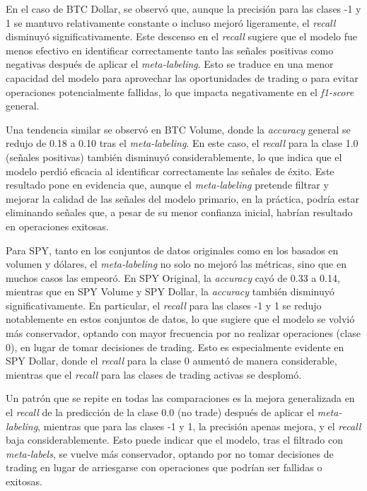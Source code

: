 \documentclass[a4paper,12pt, twoside]{report}
\begin{document}
En el caso de BTC Dollar, se observó que, aunque la precisión para las clases -1 y 1 se mantuvo relativamente 
constante o incluso mejoró ligeramente, el \textit{recall} disminuyó significativamente. Este descenso en el \textit{recall} 
sugiere que el modelo fue menos efectivo en identificar correctamente tanto las señales positivas como negativas después de 
aplicar el \textit{meta-labeling}. Esto se traduce en una menor capacidad del modelo para aprovechar las oportunidades de 
trading o para evitar operaciones potencialmente fallidas, lo que impacta negativamente en el \textit{f1-score} general.

Una tendencia similar se observó en BTC Volume, donde la \textit{accuracy} general se redujo de 0.18 a 0.10 tras el 
\textit{meta-labeling}. En este caso, el \textit{recall} para la clase 1.0 (señales positivas) también disminuyó 
considerablemente, lo que indica que el modelo perdió eficacia al identificar correctamente las señales de éxito. 
Este resultado pone en evidencia que, aunque el \textit{meta-labeling} pretende filtrar y mejorar la calidad de las 
señales del modelo primario, en la práctica, podría estar eliminando señales que, a pesar de su menor confianza 
inicial, habrían resultado en operaciones exitosas.

Para SPY, tanto en los conjuntos de datos originales como en los basados en volumen y dólares, el \textit{meta-labeling} 
no solo no mejoró las métricas, sino que en muchos casos las empeoró. En SPY Original, la \textit{accuracy} cayó de 0.33 
a 0.14, mientras que en SPY Volume y SPY Dollar, la \textit{accuracy} también disminuyó significativamente. En particular, 
el \textit{recall} para las clases -1 y 1 se redujo notablemente en estos conjuntos de datos, lo que sugiere que el 
modelo se volvió más conservador, optando con mayor frecuencia por no realizar operaciones (clase 0), en lugar de tomar 
decisiones de trading. Esto es especialmente evidente en SPY Dollar, donde el \textit{recall} para la clase 0 aumentó de 
manera considerable, mientras que el \textit{recall} para las clases de trading activas se desplomó.

Un patrón que se repite en todas las comparaciones es la mejora generalizada en el \textit{recall} de la 
predicción de la clase 0.0 (no trade) después de aplicar el \textit{meta-labeling}, mientras que para las clases -1 y 1, 
la precisión apenas mejora, y el \textit{recall} baja considerablemente. Esto puede indicar que el modelo, tras el 
filtrado con \textit{meta-labels}, se vuelve más conservador, optando por no tomar decisiones de trading en lugar 
de arriesgarse con operaciones que podrían ser fallidas o exitosas.
\end{document}
